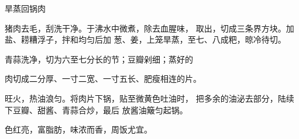 \begin{recipe}{旱蒸回锅肉}

\ingredients


\cooking

\step 猪肉去毛，刮洗干净。于沸水中微煮，除去血腥味， 取出，切成三条界方块。加盐、耢糟浮子，拌和均匀后加 葱、姜，上笼旱蒸，至七、八成粑，晾冷待切。

\step 青蒜洗净，切为六至七分长的节；豆瓣剁细；蒸好的

肉切成二分厚、一寸二宽、一寸五长、肥瘦相连的片。

\step 旺火，热油浪匀。将肉片下锅，贴至微黄色吐油时， 把多余的油泌去部分，陆续下豆瓣、甜酱、青蒜合炒，最后 放酱油簸匀起锅。

\notes

色红亮，富脂肪，味浓而香，周饭尤宜。

\end{recipe}

